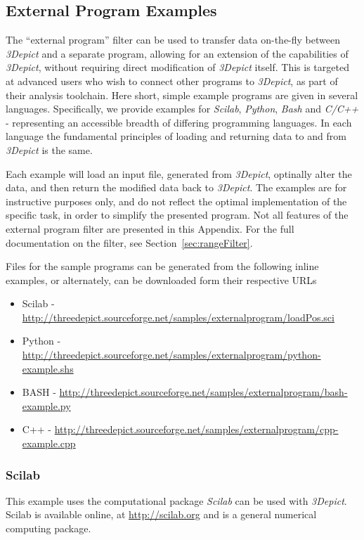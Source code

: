 \documentclass[10pt]{article}
\begin{document}
\subsection{External Program Examples}
\label{sec:externalProgExample}
The ``external program'' filter can be used to transfer data on-the-fly between \emph{3Depict} and a separate program, allowing for an extension of the capabilities of \emph{3Depict}, without requiring direct modification of \emph{3Depict} itself. This is targeted at advanced users who wish to connect other programs to \emph{3Depict}, as part of their analysis toolchain. Here short, simple example programs are given in several languages. Specifically, we provide examples for  \emph{Scilab}, \emph{Python}, \emph{Bash} and \emph{C/C++} - representing an accessible breadth of differing programming languages. In each language the fundamental principles of loading and returning data to and from \emph{3Depict} is the same.

Each example will load an input file, generated from \emph{3Depict}, optinally alter the data, and then return the modified data back to \emph{3Depict}. The examples are for instructive purposes only, and do not reflect the optimal implementation of the specific task, in order to simplify the presented program. Not all features of the external program filter are presented in this Appendix. For the full documentation on the filter, see Section~\ref{sec:rangeFilter}.

Files for the sample programs can be generated from the following inline examples, or alternately, can be downloaded form their respective URLs

\begin{itemize}
 \item Scilab - \url{http://threedepict.sourceforge.net/samples/externalprogram/loadPos.sci}
 \item Python - \url{http://threedepict.sourceforge.net/samples/externalprogram/python-example.shs}
 \item BASH - \url{http://threedepict.sourceforge.net/samples/externalprogram/bash-example.py}
 \item C++ - \url{http://threedepict.sourceforge.net/samples/externalprogram/cpp-example.cpp}
\end{itemize}



\subsubsection{Scilab}
This example uses the computational package \emph{Scilab} can be used with \emph{3Depict}. Scilab is available online, at \url{http://scilab.org} and is a general numerical computing package. 
\end{document}
